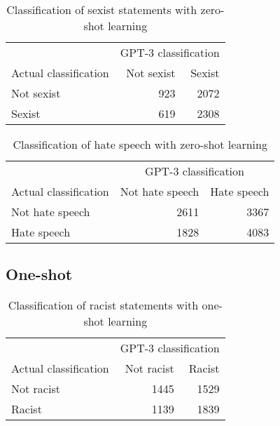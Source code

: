 \documentclass{bmcart}
\begin{document}
\begin{backmatter}
\begin{table}[!h]

\caption{\label{tab:zeroshot-sexism}Classification of sexist statements with zero-shot learning}
\centering
\fontsize{8}{10}\selectfont
\begin{tabular}[t]{lrr}
\hline
\multicolumn{1}{c}{ } & \multicolumn{2}{c}{GPT-3 classification} \\
Actual classification & Not sexist & Sexist\\
\hline
Not sexist & 923 & 2072\\
Sexist & 619 & 2308\\
\hline
\end{tabular}
\end{table}

\begin{table}[!h]

\caption{\label{tab:zeroshot-hate}Classification of hate speech with zero-shot learning}
\centering
\fontsize{8}{10}\selectfont
\begin{tabular}[t]{lrr}
\hline
\multicolumn{1}{c}{ } & \multicolumn{2}{c}{GPT-3 classification} \\
Actual classification & Not hate speech & Hate speech\\
\hline
Not hate speech & 2611 & 3367\\
Hate speech & 1828 & 4083\\
\hline
\end{tabular}
\end{table}

\newpage


\subsection{One-shot}\label{appendixboneshot}

\begin{table}[!h]

\caption{\label{tab:oneshot-racism}Classification of racist statements with one-shot learning}
\centering
\fontsize{8}{10}\selectfont
\begin{tabular}[t]{lrr}
\hline
\multicolumn{1}{c}{ } & \multicolumn{2}{c}{GPT-3 classification} \\
Actual classification & Not racist & Racist\\
\hline
Not racist & 1445 & 1529\\
Racist & 1139 & 1839\\
\hline
\end{tabular}
\end{table}


\end{backmatter}
\end{document}
